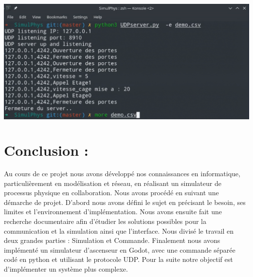 \documentclass[12pt]{article}
\begin{document}
\begin{center}\includegraphics[scale=0.4]{reception.png}\end{center}


\section*{Conclusion :}
Au cours de ce projet nous avons développé nos connaissances en informatique, particulièrement en modélisation et réseau, en réalisant un simulateur de processus physique en collaboration. 
\newline
\newline
Nous avons procédé en suivant une démarche de projet. D’abord nous avons défini le sujet en précisant le besoin, ses limites et l'environnement  d’implémentation. Nous avons ensuite fait une recherche documentaire afin d’étudier les solutions possibles pour la communication et la simulation ainsi que l’interface. Nous divisé le travail en deux grandes parties : Simulation et Commande. Finalement nous avons implémenté un simulateur d’ascenseur en Godot, avec une commande séparée codé en python et utilisant le protocole UDP.
\newline
\newline
Pour la suite notre objectif est d’implémenter un système plus complexe.
\end{document}
